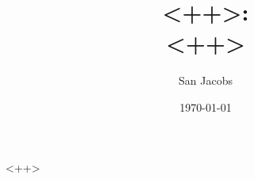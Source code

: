 \documentclass[a4paper,12pt]{article}
\begin{document}
\title{\textbf{
<++>:\\
\large{<++>}}}
\author{San Jacobs}
\date{\today}

\maketitle
\thispagestyle{empty}
\newpage
\tableofcontents
\newpage

<++>

\end{document}
